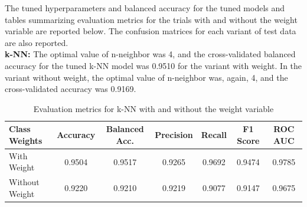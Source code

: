 \documentclass[a4paper,12pt]{article}
\begin{document}
The tuned hyperparameters and balanced accuracy for the tuned models and tables summarizing evaluation metrics for the trials with and without the weight variable are reported below. The confusion matrices for each variant of test data are also reported.\\

\textbf{k-NN:}
The optimal value of n-neighbor was 4, and the cross-validated balanced accuracy for the tuned k-NN model was 0.9510 for the variant with weight. In the variant without weight, the optimal value of n-neighbor was, again, 4, and the cross-validated accuracy was 0.9169.


\begin{table}[H]
\centering
\small
\begin{tabular}{lcccccc}
\toprule
\textbf{Class Weights} & \textbf{Accuracy} & \textbf{Balanced Acc.} & \textbf{Precision} & \textbf{Recall} & \textbf{F1 Score} & \textbf{ROC AUC} \\
\midrule
With Weight & 0.9504 & 0.9517 & 0.9265 & 0.9692 & 0.9474 & 0.9785 \\
Without Weight & 0.9220 & 0.9210 & 0.9219 & 0.9077 & 0.9147 & 0.9675 \\
\bottomrule
\end{tabular}
\caption{Evaluation metrics for k-NN with and without the weight variable}
\label{tab:knn_weights}
\end{table}
\end{document}
